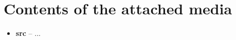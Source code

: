 \chapter{Contents of the attached media}

\begin{itemize}
    \item[] \textbf{src} – ...
\end{itemize}

